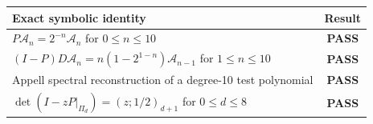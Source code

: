 \begin{center}
\begin{tabularx}{0.96\textwidth}{@{}Xc@{}}
\toprule
Exact symbolic identity & Result \\
\midrule
$P\mathcal A_n=2^{-n}\mathcal A_n$ for $0\le n\le 10$ & \textbf{PASS}  \\
$(I-P)D\mathcal A_n=n(1-2^{1-n})\mathcal A_{n-1}$ for $1\le n\le 10$ & \textbf{PASS}  \\
Appell spectral reconstruction of a degree-10 test polynomial & \textbf{PASS}  \\
$\det(I-zP|_{\Pi_d})=(z;1/2)_{d+1}$ for $0\le d\le8$ & \textbf{PASS}  \\
\bottomrule
\end{tabularx}
\end{center}
